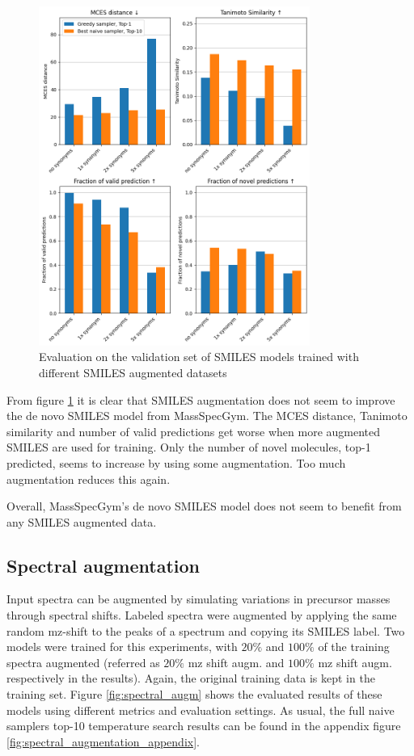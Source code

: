 \begin{figure}[h]
    \centering
    \includegraphics[width=0.79\textwidth]{figures/results/smiles_augmentation_with_tanimoto.png}
    \caption{Evaluation on the validation set of SMILES models trained with different SMILES augmented datasets}
    \label{fig:smiles_augm}
\end{figure}

From figure \ref{fig:smiles_augm} it is clear that SMILES augmentation does not seem to improve the de novo SMILES model from MassSpecGym.
The MCES distance, Tanimoto similarity and number of valid predictions get worse when more augmented SMILES are used for training.
Only the number of novel molecules, top-1 predicted, seems to increase by using some augmentation.
Too much augmentation reduces this again.

Overall, MassSpecGym's de novo SMILES model does not seem to benefit from any SMILES augmented data.

\subsection{Spectral augmentation}

Input spectra can be augmented by simulating variations in precursor masses through spectral shifts.
Labeled spectra were augmented by applying the same random mz-shift to the peaks of a spectrum and copying its SMILES label.
Two models were trained for this experiments, with $20\%$ and $100\%$ of the training spectra augmented (referred as $20\%$ mz shift augm. and $100\%$ mz shift augm. respectively in the results).
Again, the original training data is kept in the training set.
Figure \ref{fig:spectral_augm} shows the evaluated results of these models using different metrics and evaluation settings.
As usual, the full naive samplers top-10 temperature search results can be found in the appendix figure \ref{fig:spectral_augmentation_appendix}.

